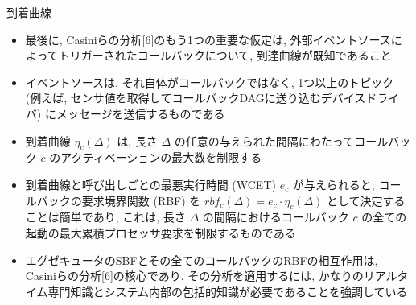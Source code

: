 \begin{frame}{到着曲線}
    \begin{itemize}
        \item 最後に, Casiniらの分析[6]のもう1つの重要な仮定は, 外部イベントソースによってトリガーされたコールバックについて, 到達曲線が既知であること
        \item イベントソースは, それ自体がコールバックではなく, 1つ以上のトピック (例えば, センサ値を取得してコールバックDAGに送り込むデバイスドライバ) にメッセージを送信するものである
        \item 到着曲線 $\eta_{c}(\Delta)$ は, 長さ $\Delta$ の任意の与えられた間隔にわたってコールバック $c$ のアクティベーションの最大数を制限する
    \end{itemize}
\end{frame}

\begin{frame}{}
    \begin{itemize}
        \item 到着曲線と呼び出しごとの最悪実行時間 (WCET)  $e_{c}$ が与えられると, コールバックの要求境界関数 (RBF) を $r b f_{c}(\Delta)=e_{c} \cdot \eta_{c}(\Delta)$ として決定することは簡単であり, これは, 長さ $\Delta$ の間隔におけるコールバック $c$ の全ての起動の最大累積プロセッサ要求を制限するものである
        \item エグゼキュータのSBFとその全てのコールバックのRBFの相互作用は, Casiniらの分析[6]の核心であり, その分析を適用するには, かなりのリアルタイム専門知識とシステム内部の包括的知識が必要であることを強調している
    \end{itemize}
\end{frame}
